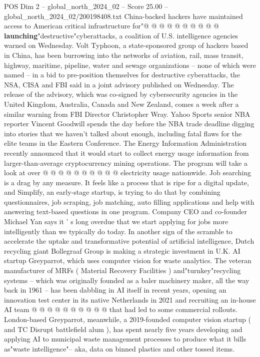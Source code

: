 \begin{textsample}{POS Dim 2 – global\_north\_2024\_02 – Score 25.00 – global\_north\_2024\_02/200198408.txt}
China-backed hackers have maintained access to American critical infrastructure for"@ @ @ @ @ @ @ @ @ @ \textbf{launching}"destructive"cyberattacks, a coalition of U.S. intelligence agencies warned on Wednesday.
Volt Typhoon, a state-sponsored group of hackers based in China, has been burrowing into the networks of aviation, rail, mass transit, highway, maritime, pipeline, water and sewage organizations -- none of which were named -- in a bid to pre-position themselves for destructive cyberattacks, the NSA, CISA and FBI said in a joint advisory published on Wednesday.
The release of the advisory, which was co-signed by cybersecurity agencies in the United Kingdom, Australia, Canada and New Zealand, comes a week after a similar warning from FBI Director Christopher Wray.
Yahoo Sports senior NBA reporter Vincent Goodwill spends the day before the NBA trade deadline digging into stories that we haven't talked about enough, including fatal flaws for the elite teams in the Eastern Conference.
The Energy Information Administration recently announced that it would start to collect energy usage information from larger-than-average cryptocurrency mining operations.
The program will take a look at over @ @ @ @ @ @ @ @ @ @ electricity usage nationwide.
Job searching is a drag by any measure.
It feels like a process that is ripe for a digital update, and Simplify, an early-stage startup, is trying to do that by combining questionnaires, job scraping, job matching, auto filling applications and help with answering text-based questions in one program.
Company CEO and co-founder Michael Yan says it ' s long overdue that we start applying for jobs more intelligently than we typically do today.
In another sign of the scramble to accelerate the uptake and transformative potential of artificial intelligence, Dutch recycling giant Bollegraaf Group is making a strategic investment in U.K.
AI startup Greyparrot, which uses computer vision for waste analytics.
The veteran manufacturer of MRFs ( Material Recovery Facilities ) and"turnkey"recycling systems -- which was originally founded as a baler machinery maker, all the way back in 1961 -- has been dabbling in AI itself in recent years, opening an innovation test center in its native Netherlands in 2021 and recruiting an in-house AI team @ @ @ @ @ @ @ @ @ @ that had led to some commercial rollouts.
London-based Greyparrot, meanwhile, a 2019-founded computer vision startup ( and TC Disrupt battlefield alum ), has spent nearly five years developing and applying AI to municipal waste management processes to produce what it bills as"waste intelligence"-- aka, data on binned plastics and other tossed items.

\end{textsample}
